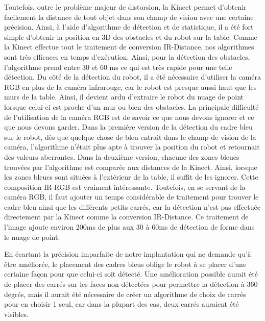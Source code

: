 Toutefois, outre le problème majeur de distorsion, la Kinect permet d'obtenir facilement la distance de tout objet dans son champ de vision avec une certaine précision. Ainsi, à l'aide d'algorithme de détection et de statistique, il a été fort simple d'obtenir la position en 3D des obstacles et du robot sur la table. Comme la Kinect effectue tout le traitement de conversion IR-Distance, nos algorithmes sont très efficaces en temps d'exécution. Ainsi, pour la détection des obstacles, l'algorithme prend entre 30 et 60 ms ce qui est très rapide pour une telle détection. Du côté de la détection du robot, il a été nécessaire d'utiliser la caméra RGB en plus de la caméra infrarouge, car le robot est presque aussi haut que les murs de la table. Ainsi, il devient ardu d'extraire le robot du nuage de point lorsque celui-ci est proche d'un mur ou bien des obstacles. La principale difficulté de l'utilisation de la caméra RGB est de savoir ce que nous devons ignorer et ce que nous devons garder. Dans la première version de la détection du cadre bleu sur le robot, dès que quelque chose de bleu entrait dans le champ de vision de la caméra, l'algorithme n'était plus apte à trouver la position du robot et retournait des valeurs aberrantes. Dans la deuxième version, chacune des zones bleues trouvées par l'algorithme est comparée aux distances de la Kinect. Ainsi, lorsque les zones bleues sont situées à l'extérieur de la table, il suffit de les ignorer. Cette composition IR-RGB est vraiment intéressante. Toutefois, en se servant de la caméra RGB, il faut ajouter un temps considérable de traitement pour trouver le cadre bleu ainsi que les différents petits carrés, car la détection n'est pas effectuée directement par la Kinect comme la conversion IR-Distance. Ce traitement de l'image ajoute environ 200ms de plus aux 30 à 60ms de détection de forme dans le nuage de point.

En écartant la précision imparfaite de notre implantation qui ne demande qu'à être améliorée, le placement des cadres bleus oblige le robot à se placer d'une certaine façon pour que celui-ci soit détecté. Une amélioration possible aurait été de placer des carrés sur les faces non détectées pour permettre la détection à 360 degrés, mais il aurait été nécessaire de créer un algorithme de choix de carrés pour en choisir 1 seul, car dans la plupart des cas, deux carrés auraient été visibles.

